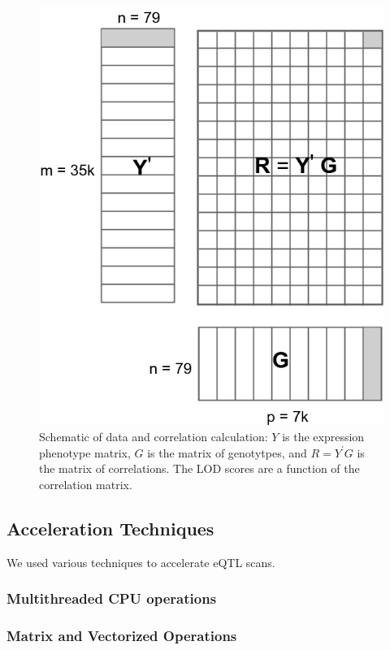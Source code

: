 \documentclass[9pt,twocolumn,twoside,lineno]{gsag3jnl}
\begin{document}
      \begin{figure}[!htb]
	
	\caption{Schematic of data and correlation calculation: $Y$ is
		the expression phenotype matrix, $G$ is the matrix of
		genotytpes, and $R=Y^{\prime}G$ is the matrix of
		correlations.  The LOD scores are a function of the
		correlation matrix.}
	\label{MatrixMult}
	\includegraphics[scale = .4]{figs/YGmatrix.png}
\end{figure}    

\subsection{Acceleration Techniques}
We used various techniques to accelerate eQTL scans. 
\subsubsection{Multithreaded CPU operations}
 
\subsubsection{Matrix and Vectorized Operations}
\end{document}
